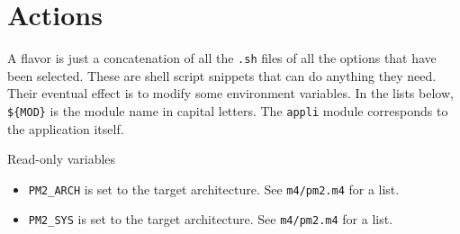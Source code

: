 \documentclass[11pt, a4paper ,twoside]{article}
\begin{document}
\section{Actions}

A flavor is just a concatenation of all the \verb+.sh+ files of all the
options that have been selected.  These are shell script snippets that
can do anything they need.  Their eventual effect is to modify some
environment variables.  In the lists below, \verb+${MOD}+ is the module
name in capital letters.  The \verb+appli+ module corresponds to 
the application itself.

Read-only variables
\begin{itemize}
\item \verb+PM2_ARCH+ is set to the target architecture. See
\verb+m4/pm2.m4+ for a list.
\item \verb+PM2_SYS+ is set to the target architecture. See
\verb+m4/pm2.m4+ for a list.
\end{itemize}
\end{document}
